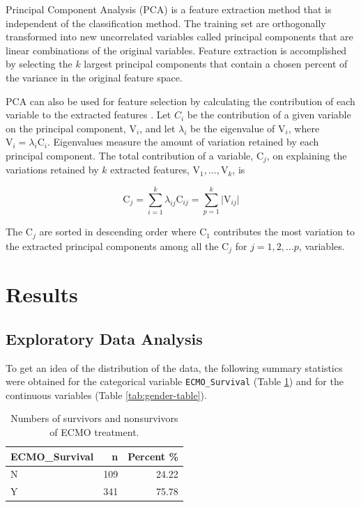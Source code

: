 \documentclass[12pt,]{article}
\begin{document}
Principal Component Analysis (PCA) \citep{f.r.s_liii._1901} is a feature
extraction method that is independent of the classification method. The
training set are orthogonally transformed into new uncorrelated
variables called principal components that are linear combinations of
the original variables. Feature extraction is accomplished by selecting
the \(k\) largest principal components that contain a chosen percent of
the variance in the original feature space.

PCA can also be used for feature selection by calculating the
contribution of each variable to the extracted features
\citep{song_feature_2010}. Let \(C_i\) be the contribution of a given
variable on the principal component, \(\text{V}_i\), and let
\(\lambda_i\) be the eigenvalue of \(\text{V}_i\), where
\(\text{V}_{i} = \lambda_i \text{C}_i\). Eigenvalues measure the amount
of variation retained by each principal component. The total
contribution of a variable, \(\text{C}_j\), on explaining the variations
retained by \(k\) extracted features, \(\text{V}_1, ..., \text{V}_k\),
is

\[
\text{C}_j = \sum^k_{i=1}\lambda_{ij} \text{C}_{ij} = \sum^k_{p=1} \vert \text{V}_{ij} \vert 
\]

The \(\text{C}_j\) are sorted in descending order where \(\text{C}_1\)
contributes the most variation to the extracted principal components
among all the \(\text{C}_j\) for \(j=1,2,...p\), variables.

\newpage

\section{Results}\label{results}

\subsection{Exploratory Data Analysis}\label{exploratory-data-analysis}

To get an idea of the distribution of the data, the following summary
statistics were obtained for the categorical variable
\texttt{ECMO\_Survival} (Table \ref{tab:ECMO_Survival-table}) and for
the continuous variables (Table \ref{tab:gender-table}).

\begin{table}[!h]

\caption{\label{tab:unnamed-chunk-3}\label{tab:ECMO_Survival-table} Numbers of survivors and nonsurvivors of ECMO treatment.}
\centering
\fontsize{10}{12}\selectfont
\begin{tabular}{lrr}
\toprule
ECMO\_Survival & n & Percent \%\\
\midrule
N & 109 & 24.22\\
Y & 341 & 75.78\\
\bottomrule
\end{tabular}
\end{table}
\end{document}

